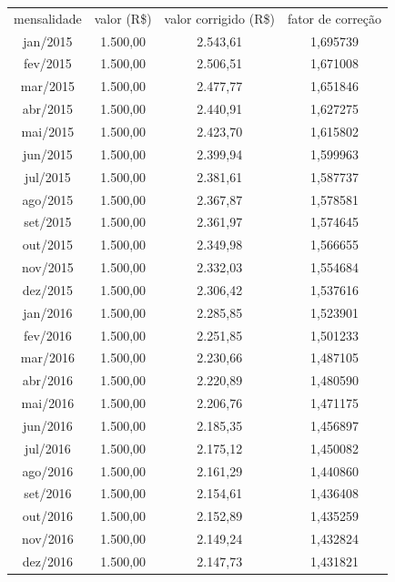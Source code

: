 \documentclass[11pt]{letter}
\begin{document}
\begin{scriptsize}
\begin{center}
\begin{tabular}{ c c c c }
mensalidade & valor (R\$) & valor corrigido (R\$) & fator de correção \\ 
jan/2015 & 1.500,00 &  2.543,61 & 1,695739 \\  
fev/2015 & 1.500,00 &  2.506,51 & 1,671008 \\
mar/2015 & 1.500,00 &  2.477,77 & 1,651846 \\
abr/2015 & 1.500,00 &  2.440,91 & 1,627275 \\
mai/2015 & 1.500,00 &  2.423,70 & 1,615802 \\
jun/2015 & 1.500,00 &  2.399,94 & 1,599963 \\
jul/2015 & 1.500,00 &  2.381,61 & 1,587737 \\
ago/2015 & 1.500,00 &  2.367,87 & 1,578581 \\
set/2015 & 1.500,00 &  2.361,97 & 1,574645 \\
out/2015 & 1.500,00 &  2.349,98 & 1,566655 \\
nov/2015 & 1.500,00 &  2.332,03 & 1,554684 \\
dez/2015 & 1.500,00 &  2.306,42 & 1,537616 \\
jan/2016 & 1.500,00 &  2.285,85 & 1,523901 \\  
fev/2016 & 1.500,00 &  2.251,85 & 1,501233 \\
mar/2016 & 1.500,00 &  2.230,66 & 1,487105 \\
abr/2016 & 1.500,00 &  2.220,89 & 1,480590 \\
mai/2016 & 1.500,00 &  2.206,76 & 1,471175 \\
jun/2016 & 1.500,00 &  2.185,35 & 1,456897 \\
jul/2016 & 1.500,00 &  2.175,12 & 1,450082 \\
ago/2016 & 1.500,00 &  2.161,29 & 1,440860 \\
set/2016 & 1.500,00 &  2.154,61 & 1,436408 \\
out/2016 & 1.500,00 &  2.152,89 & 1,435259 \\
nov/2016 & 1.500,00 &  2.149,24 & 1,432824 \\
dez/2016 & 1.500,00 &  2.147,73 & 1,431821 \\


\end{tabular}
\end{center}
\end{scriptsize}
\end{document}
